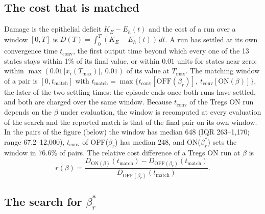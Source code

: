 \documentclass[11pt]{article}
\begin{document}
\subsection{The cost that is matched}

Damage is the epithelial deficit $K_E - E_h(t)$ and the cost of a run over a window $[0, T]$ is
$D(T) = \int_0^{T} (K_E - E_h(t))\,dt$. A run has settled at its own convergence time
$t_{\mathrm{conv}}$, the first output time beyond which every one of the 13 states stays within
1\% of its final value, or within $0.01$ units for states near zero: within
$\max(0.01\,|x_i(T_{\max})|,\ 0.01)$ of its value at $T_{\max}$. The matching window of a pair is
$[0, t_{\mathrm{match}}]$ with
$t_{\mathrm{match}} = \max\{t_{\mathrm{conv}}[\mathrm{OFF}(\beta_r)],\ t_{\mathrm{conv}}[\mathrm{ON}(\beta)]\}$,
the later of the two settling times: the episode ends once both runs have settled, and both are
charged over the same window.
Because $t_{\mathrm{conv}}$ of the Tregs ON run depends on the $\beta$ under evaluation, the
window is recomputed at every evaluation of the search and the reported match is that of the
final pair on its own window. In the pairs of the figure (below) the window has median 648
(IQR 263--1{,}170; range 67.2--12{,}000), $t_{\mathrm{conv}}$ of OFF($\beta_r$) has median 248, and
ON($\beta_r^{*}$) sets the window in 76.6\% of pairs. The relative cost difference of a
Tregs ON run at $\beta$ is
\[
r(\beta) = \frac{D_{\mathrm{ON}(\beta)}(t_{\mathrm{match}}) - D_{\mathrm{OFF}(\beta_r)}(t_{\mathrm{match}})}{D_{\mathrm{OFF}(\beta_r)}(t_{\mathrm{match}})} .
\]

\subsection{The search for $\beta_r^{*}$}
\end{document}
